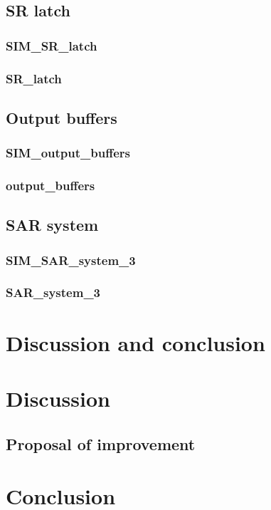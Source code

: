 \documentclass[english, 12pt, a4paper]{article}
\begin{document}
\subsection{SR latch}
\subsubsection{SIM\_SR\_latch}
\subsubsection{SR\_latch}

\subsection{Output buffers}
\subsubsection{SIM\_output\_buffers}
\subsubsection{output\_buffers}

\subsection{SAR system}
\subsubsection{SIM\_SAR\_system\_3}
\subsubsection{SAR\_system\_3}


\section{Discussion and conclusion}
\section{Discussion}
\subsection{Proposal of improvement}
\section{Conclusion}
\end{document}
